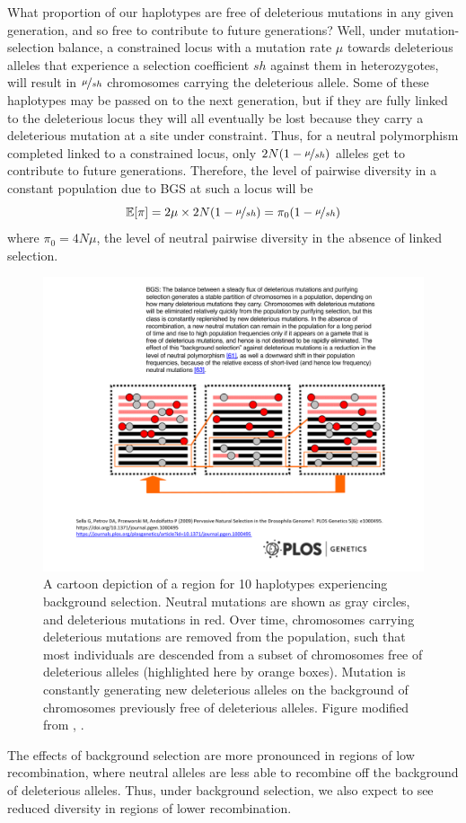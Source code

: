 What proportion of our haplotypes are free of
deleterious mutations in any given generation, and so free to
contribute to future generations? Well, under mutation-selection
balance, a constrained locus with a mutation rate $\mu$ towards
deleterious alleles that experience a selection coefficient $sh$
against them in heterozygotes, will result in $\nicefrac{\mu}{sh}$
chromosomes carrying the deleterious allele. Some of these haplotypes may be passed on to the next generation, but if they are fully linked to the deleterious locus they will all eventually be lost because they carry a deleterious mutation at a site under constraint. Thus, for a neutral polymorphism
completed linked to a constrained locus, only
$2N(1-\nicefrac{\mu}{sh})$ alleles get to contribute to future
generations. Therefore, the level of pairwise diversity in a constant
population due to BGS at such a locus will be
\begin{equation}
\mathbb{E}[\pi] = 2 \mu \times 2N(1-\nicefrac{\mu}{sh}) = \pi_0  (1-\nicefrac{\mu}{sh})
\end{equation}
where $\pi_0= 4N\mu$, the level of neutral pairwise diversity in the
absence of linked selection.

\begin{figure}
\begin{center}
\includegraphics[width=0.75 \textwidth]{figures/Hitchhiking/BGS_cartoon.pdf}
\end{center}
\caption{A cartoon depiction of a region for 10 haplotypes
  experiencing background selection. Neutral mutations are shown as
  gray circles, and deleterious mutations in red. Over time,
  chromosomes carrying deleterious mutations are removed from the
  population, such that most individuals are descended from a subset of
  chromosomes free of deleterious alleles (highlighted here by orange boxes). Mutation is constantly generating new deleterious alleles on
  the background of chromosomes previously free of deleterious
  alleles. Figure modified from \citet{sella2009pervasive}, \PLOSccBY.} \label{fig:BGS_cartoon}
\end{figure}
The effects of background selection are more pronounced in regions of low recombination, where
neutral alleles are less able to recombine off the background of deleterious
alleles. Thus, under background selection, we also expect to see
reduced diversity in regions of lower recombination. 

